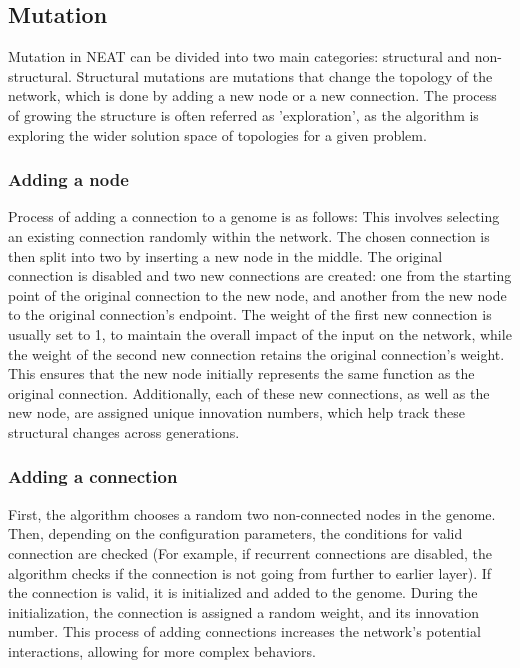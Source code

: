 \documentclass{article}
\begin{document}
\subsection{Mutation}
Mutation in NEAT can be divided into two main categories: structural and non-structural.
Structural mutations are mutations that change the topology of the network, which is done by adding a new node or a new connection. The process of growing
the structure is often referred as 'exploration', as the algorithm is exploring the wider solution space of topologies for a given problem.
\subsubsection{Adding a node}
Process of adding a connection to a genome is as follows:
This involves selecting an existing connection randomly within the network.
The chosen connection is then split into two by inserting a new node in the middle.
The original connection is disabled and two new connections are created: one from the starting point of the original connection to the new node,
and another from the new node to the original connection's endpoint. The weight of the first new connection is usually set to 1,
to maintain the overall impact of the input on the network, while the weight of the second new connection retains the original connection's weight.
This ensures that the new node initially represents the same function as the original connection. Additionally, each of these new connections,
as well as the new node, are assigned unique innovation numbers, which help track these structural changes across generations. 
\subsubsection{Adding a connection}
First, the algorithm chooses a random two non-connected nodes in the genome. Then, depending on the configuration parameters, the conditions for valid connection
are checked (For example, if recurrent connections are disabled, the algorithm checks if the connection is not going from further to earlier layer). 
If the connection is valid, it is initialized and added to the genome. During the initialization, the connection is assigned a random weight, and its innovation
number.
This process of adding connections increases the network's potential interactions, allowing for more complex behaviors.
\end{document}
